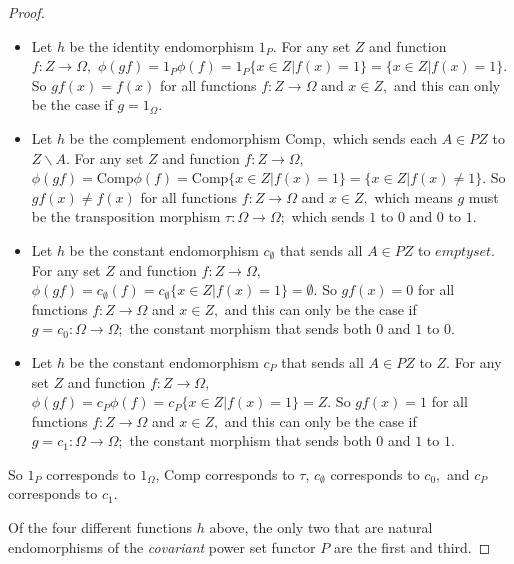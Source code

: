 \documentclass[main.tex]{subfiles}
\begin{document}
\begin{proof}
	\begin{itemize}
		\item Let $ h $ be the identity endomorphism $ 1_P $. For any
			set $ Z $ and function $ f\colon Z \to \Omega, $ $ \phi(gf)
			= 1_P\phi(f) = 1_P\{x \in Z | f(x) = 1\} = \{x \in Z |
			f(x) = 1\}. $ So $ gf(x) = f(x) $ for all functions $
			f\colon Z \to \Omega $ and $ x \in Z, $ and this can only be
			the case if $ g = 1_\Omega. $
		\item Let $ h $ be the complement endomorphism $ \mathrm{Comp},
			$ which sends each $ A\in PZ $ to $ Z\backslash A $.
			For any set $ Z $ and function $ f\colon Z \to \Omega, $ $
			\phi(gf) = \mathrm{Comp}\phi(f) = \mathrm{Comp}\{x \in
			Z | f(x) = 1\} = \{x \in Z | f(x) \neq 1\}. $ So $
			gf(x) \neq f(x) $ for all functions $ f\colon Z \to \Omega $
			and $ x \in Z, $ which means $ g $ must be the
			transposition morphism $ \tau\colon\Omega \to \Omega; $
			which sends $ 1 $ to $ 0 $ and $ 0 $ to $ 1 $.
		\item Let $ h $ be the constant endomorphism $ c_\emptyset $
			that sends all $ A\in PZ $ to $ emptyset. $ For any set
			$ Z $ and function $ f\colon Z \to \Omega, $ $ \phi(gf) =
			c_\emptyset(f) = c_\emptyset\{x \in Z | f(x) = 1\} =
			\emptyset. $ So $ gf(x) = 0 $ for all functions $ f\colon Z
			\to \Omega $ and $ x \in Z, $  and this can only be the
			case if $ g = c_0\colon\Omega \to \Omega; $ the constant
			morphism that sends both $ 0 $ and $ 1 $ to $ 0. $ 
		\item Let $ h $ be the constant endomorphism $ c_P $ that sends
			all $ A\in PZ $ to $ Z. $ For any set $ Z $ and
			function $ f\colon Z \to \Omega, $ $ \phi(gf) = c_P\phi(f) =
			c_P\{x \in Z | f(x) = 1\} = Z. $ So $ gf(x) = 1 $ for
			all functions $ f\colon Z \to \Omega $ and $ x \in Z, $  and
			this can only be the case if $ g = c_1\colon\Omega \to
			\Omega; $ the constant morphism that sends both $ 0 $
			and $ 1 $ to $ 1. $
	\end{itemize}

	So $ 1_P $ corresponds to $ 1_\Omega $, $ \mathrm{Comp} $ corresponds
	to $ \tau $, $ c_\emptyset $ corresponds to $ c_0, $ and $ c_P $
	corresponds to $ c_1 $.


	Of the four different functions $h$ above, the only two that are natural
	endomorphisms of the \emph{covariant} power set functor $P$ are the first
	and third.


\end{proof}
\end{document}
